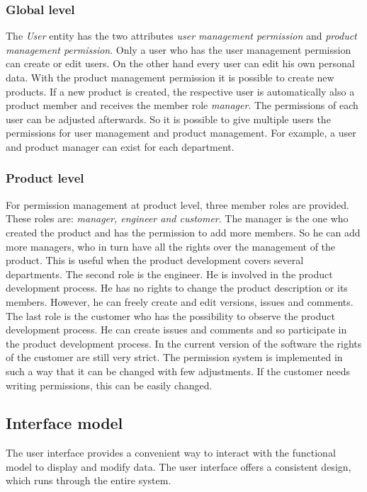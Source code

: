 \subsubsection*{Global level}

The \textit{User} entity has the two attributes \textit{user management permission} and \textit{product management permission}. Only a user who has the user management permission can create or edit users. On the other hand every user can edit his own personal data. With the product management permission it is possible to create new products. If a new product is created, the respective user is automatically also a product member and receives the member role \textit{manager}. The permissions of each user can be adjusted afterwards. So it is possible to give multiple users the permissions for user management and product management. For example, a user and product manager can exist for each department. 

\subsubsection*{Product level}

For permission management at product level, three member roles are provided. These roles are: \textit{manager, engineer and customer}. The manager is the one who created the product and has the permission to add more members. So he can add more managers, who in turn have all the rights over the management of the product. This is useful when the product development covers several departments. The second role is the engineer. He is involved in the product development process. He has no rights to change the product description or its members. However, he can freely create and edit versions, issues and comments. The last role is the customer who has the possibility to observe the product development process. He can create issues and comments and so participate in the product development process. In the current version of the software the rights of the customer are still very strict. The permission system is implemented in such a way that it can be changed with few adjustments. If the customer needs writing permissions, this can be easily changed.

\subsection{Interface model}

The user interface provides a convenient way to interact with the functional model to display and modify data. The user interface offers a consistent design, which runs through the entire system.

